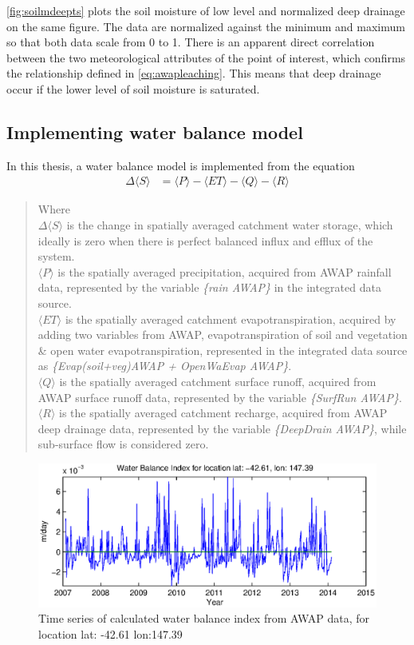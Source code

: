 \autoref{fig:soilmdeepts} plots the soil moisture of low level and normalized deep drainage on the same figure. The data are normalized against the minimum and maximum so that both data scale from 0 to 1. There is an apparent direct correlation between the two meteorological attributes of the point of interest, which confirms the relationship defined in \autoref{eq:awapleaching}. This means that deep drainage occur if the lower level of soil moisture is saturated.
\subsection{Implementing water balance model}
In this thesis, a water balance model is implemented from the equation 
\begin{align}
	\Delta \langle S\rangle &= \langle P\rangle - \langle ET\rangle-\langle Q\rangle-\langle R\rangle
	\label{eq:wbsimple}
\end{align}
\begin{quote}Where \\
\indent$\Delta \langle S\rangle$ is the change in spatially averaged catchment water storage, which ideally is zero when there is perfect balanced influx and efflux of the system.\\
\indent$\langle P\rangle$ is the spatially averaged precipitation, acquired from AWAP rainfall data, represented by the variable \emph{\{rain AWAP\}} in the integrated data source.\\
\indent$\langle ET\rangle$ is the spatially averaged catchment evapotranspiration, acquired by adding two variables from AWAP, evapotranspiration of soil and vegetation \& open water evapotranspiration, represented in the integrated data source as \emph{\{Evap(soil+veg)AWAP + OpenWaEvap AWAP\}}.\\
\indent$\langle Q\rangle$ is the spatially averaged catchment surface runoff, acquired from AWAP surface runoff data, represented by the variable \emph{\{SurfRun AWAP\}}.\\
\indent$\langle R\rangle$ is the spatially averaged catchment recharge, acquired from AWAP deep drainage data, represented by the variable \emph{\{DeepDrain AWAP\}}, while sub-surface flow is considered zero.
\end{quote}
\begin{figure}[hbt]
\begin{center}
\includegraphics[width=\linewidth]{gfx/waterts.eps}
\end{center}
\caption{Time series of calculated water balance index from AWAP data, for location lat: -42.61 lon:147.39}
\label{fig:waterts}
\end{figure}
